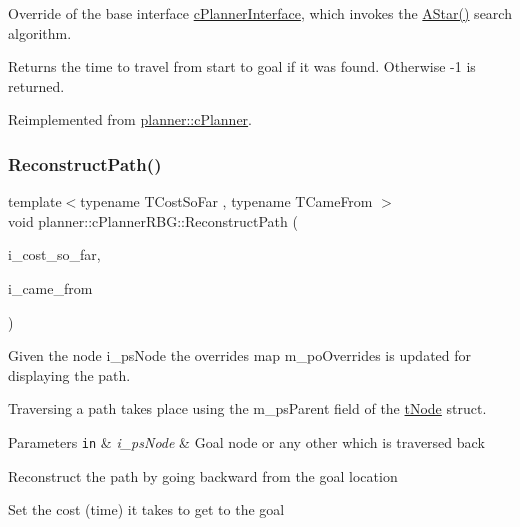 Override of the base interface \mbox{\hyperlink{classplanner_1_1c_planner_interface}{c\+Planner\+Interface}}, which invokes the \mbox{\hyperlink{classplanner_1_1c_planner_r_b_g_affd7011ef4df878a8e95ecf7f42c8e6f}{A\+Star()}} search algorithm. 

\begin{DoxyReturn}{Returns}
the time to travel from start to goal if it was found. Otherwise -\/1 is returned. 
\end{DoxyReturn}


Reimplemented from \mbox{\hyperlink{classplanner_1_1c_planner_a21230c015260b9fc34ad2f239592470e}{planner\+::c\+Planner}}.

\mbox{\label{classplanner_1_1c_planner_r_b_g_a1af74d398b286f1e05e6ade495efbbd0}} 
\subsubsection{\texorpdfstring{Reconstruct\+Path()}{ReconstructPath()}}
{\footnotesize\ttfamily template$<$typename T\+Cost\+So\+Far , typename T\+Came\+From $>$ \\
void planner\+::c\+Planner\+R\+B\+G\+::\+Reconstruct\+Path (\begin{DoxyParamCaption}\item[{T\+Cost\+So\+Far \&\&}]{i\+\_\+cost\+\_\+so\+\_\+far,  }\item[{T\+Came\+From \&\&}]{i\+\_\+came\+\_\+from }\end{DoxyParamCaption})}



Given the node i\+\_\+ps\+Node the overrides map m\+\_\+po\+Overrides is updated for displaying the path. 

Traversing a path takes place using the m\+\_\+ps\+Parent field of the \mbox{\hyperlink{structplanner_1_1t_node}{t\+Node}} struct. 
\begin{DoxyParams}[1]{Parameters}
\mbox{\tt in}  & {\em i\+\_\+ps\+Node} & Goal node or any other which is traversed back \\
\hline
\end{DoxyParams}
Reconstruct the path by going backward from the goal location

Set the cost (time) it takes to get to the goal


